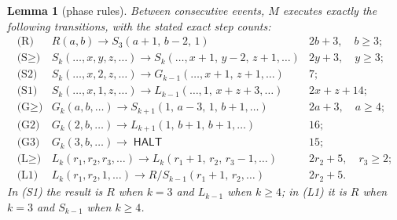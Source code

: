 \documentclass[11pt]{amsart}
\newtheorem{lemma}[theorem]{Lemma}
\theoremstyle{definition}
\DeclareMathOperator{\HALT}{\textsf{HALT}}
\begin{document}
\begin{lemma}[phase rules]\label{lem:rules}
Between consecutive events, $M$ executes exactly the following transitions,
with the stated exact step counts:
\[
\begin{array}{llc}
\text{(R)} & R(a,b)\to S_3(a{+}1,\,b{-}2,\,1) & 2b+3,\quad b\ge3;\\[2pt]
\text{(S$\ge$)} & S_k(\dots,x,y,z,\dots)\to S_k(\dots,x{+}1,\,y{-}2,\,z{+}1,\dots) & 2y+3,\quad y\ge3;\\[2pt]
\text{(S2)} & S_k(\dots,x,2,z,\dots)\to G_{k-1}(\dots,x{+}1,\,z{+}1,\dots) & 7;\\[2pt]
\text{(S1)} & S_k(\dots,x,1,z,\dots)\to L_{k-1}(\dots,1,\,x{+}z{+}3,\dots) & 2x+z+14;\\[2pt]
\text{(G$\ge$)} & G_k(a,b,\dots)\to S_{k+1}(1,\,a{-}3,\,1,\,b{+}1,\dots) & 2a+3,\quad a\ge4;\\[2pt]
\text{(G2)} & G_k(2,b,\dots)\to L_{k+1}(1,\,b{+}1,\,b{+}1,\dots) & 16;\\[2pt]
\text{(G3)} & G_k(3,b,\dots)\to \HALT & 15;\\[2pt]
\text{(L$\ge$)} & L_k(r_1,r_2,r_3,\dots)\to L_k(r_1{+}1,\,r_2,\,r_3{-}1,\dots) & 2r_2+5,\quad r_3\ge2;\\[2pt]
\text{(L1)} & L_k(r_1,r_2,1,\dots)\to R/S_{k-1}(r_1{+}1,\,r_2,\dots) & 2r_2+5.
\end{array}
\]
In (S1) the result is $R$ when $k=3$ and $L_{k-1}$ when $k\ge4$; in (L1) it
is $R$ when $k=3$ and $S_{k-1}$ when $k\ge4$.
\end{lemma}
\end{document}
